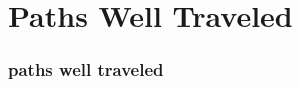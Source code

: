 \section{Paths Well Traveled}
\begin{comment}
* existing programmes and opportunities
** GSOC
** Creative Commons uni program
** Wikipedia Prof Program
** TOS (sorta) / POSSE? (maybe)
\end{comment}

\begin{frame} 
\frametitle{paths well traveled}
\end{frame} 
